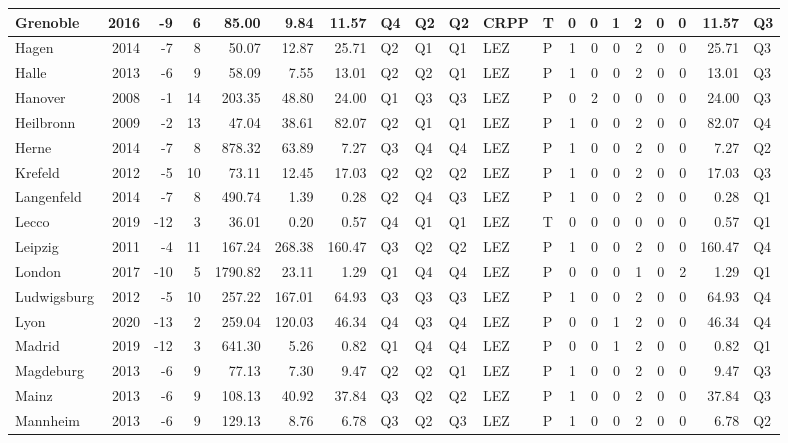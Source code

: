 \begin{tabular}{l|r|r|r|r|r|r|l|l|l|l|l|r|r|r|r|r|r|r|l}
\hline
Grenoble & 2016 & -9 & 6 & 85.00 & 9.84 & 11.57 & Q4 & Q2 & Q2 & CRPP & T & 0 & 0 & 1 & 2 & 0 & 0 & 11.57 & Q3\\
\hline
Hagen & 2014 & -7 & 8 & 50.07 & 12.87 & 25.71 & Q2 & Q1 & Q1 & LEZ & P & 1 & 0 & 0 & 2 & 0 & 0 & 25.71 & Q3\\
\hline
Halle & 2013 & -6 & 9 & 58.09 & 7.55 & 13.01 & Q2 & Q2 & Q1 & LEZ & P & 1 & 0 & 0 & 2 & 0 & 0 & 13.01 & Q3\\
\hline
Hanover & 2008 & -1 & 14 & 203.35 & 48.80 & 24.00 & Q1 & Q3 & Q3 & LEZ & P & 0 & 2 & 0 & 0 & 0 & 0 & 24.00 & Q3\\
\hline
Heilbronn & 2009 & -2 & 13 & 47.04 & 38.61 & 82.07 & Q2 & Q1 & Q1 & LEZ & P & 1 & 0 & 0 & 2 & 0 & 0 & 82.07 & Q4\\
\hline
Herne & 2014 & -7 & 8 & 878.32 & 63.89 & 7.27 & Q3 & Q4 & Q4 & LEZ & P & 1 & 0 & 0 & 2 & 0 & 0 & 7.27 & Q2\\
\hline
Krefeld & 2012 & -5 & 10 & 73.11 & 12.45 & 17.03 & Q2 & Q2 & Q2 & LEZ & P & 1 & 0 & 0 & 2 & 0 & 0 & 17.03 & Q3\\
\hline
Langenfeld & 2014 & -7 & 8 & 490.74 & 1.39 & 0.28 & Q2 & Q4 & Q3 & LEZ & P & 1 & 0 & 0 & 2 & 0 & 0 & 0.28 & Q1\\
\hline
Lecco & 2019 & -12 & 3 & 36.01 & 0.20 & 0.57 & Q4 & Q1 & Q1 & LEZ & T & 0 & 0 & 0 & 0 & 0 & 0 & 0.57 & Q1\\
\hline
Leipzig & 2011 & -4 & 11 & 167.24 & 268.38 & 160.47 & Q3 & Q2 & Q2 & LEZ & P & 1 & 0 & 0 & 2 & 0 & 0 & 160.47 & Q4\\
\hline
London & 2017 & -10 & 5 & 1790.82 & 23.11 & 1.29 & Q1 & Q4 & Q4 & LEZ & P & 0 & 0 & 0 & 1 & 0 & 2 & 1.29 & Q1\\
\hline
Ludwigsburg & 2012 & -5 & 10 & 257.22 & 167.01 & 64.93 & Q3 & Q3 & Q3 & LEZ & P & 1 & 0 & 0 & 2 & 0 & 0 & 64.93 & Q4\\
\hline
Lyon & 2020 & -13 & 2 & 259.04 & 120.03 & 46.34 & Q4 & Q3 & Q4 & LEZ & P & 0 & 0 & 1 & 2 & 0 & 0 & 46.34 & Q4\\
\hline
Madrid & 2019 & -12 & 3 & 641.30 & 5.26 & 0.82 & Q1 & Q4 & Q4 & LEZ & P & 0 & 0 & 1 & 2 & 0 & 0 & 0.82 & Q1\\
\hline
Magdeburg & 2013 & -6 & 9 & 77.13 & 7.30 & 9.47 & Q2 & Q2 & Q1 & LEZ & P & 1 & 0 & 0 & 2 & 0 & 0 & 9.47 & Q3\\
\hline
Mainz & 2013 & -6 & 9 & 108.13 & 40.92 & 37.84 & Q3 & Q2 & Q2 & LEZ & P & 1 & 0 & 0 & 2 & 0 & 0 & 37.84 & Q3\\
\hline
Mannheim & 2013 & -6 & 9 & 129.13 & 8.76 & 6.78 & Q3 & Q2 & Q3 & LEZ & P & 1 & 0 & 0 & 2 & 0 & 0 & 6.78 & Q2\\

\end{tabular}
